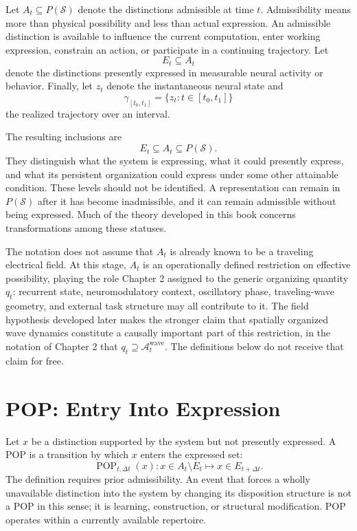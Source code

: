 \documentclass[11pt]{book}
\begin{document}
Let $A_t\subseteq P(\mathcal S)$ denote the distinctions admissible at time $t$. Admissibility means more than physical possibility and less than actual expression. An admissible distinction is available to influence the current computation, enter working expression, constrain an action, or participate in a continuing trajectory. Let
\[
E_t\subseteq A_t
\]
denote the distinctions presently expressed in measurable neural activity or behavior. Finally, let $z_t$ denote the instantaneous neural state and
\[
\gamma_{[t_0,t_1]}
=
\{z_t:t\in[t_0,t_1]\}
\]
the realized trajectory over an interval.

The resulting inclusions are
\[
E_t\subseteq A_t\subseteq P(\mathcal S).
\]
They distinguish what the system is expressing, what it could presently express, and what its persistent organization could express under some other attainable condition. These levels should not be identified. A representation can remain in $P(\mathcal S)$ after it has become inadmissible, and it can remain admissible without being expressed. Much of the theory developed in this book concerns transformations among these statuses.

The notation does not assume that $A_t$ is already known to be a traveling electrical field. At this stage, $A_t$ is an operationally defined restriction on effective possibility, playing the role Chapter 2 assigned to the generic organizing quantity $q_t$: recurrent state, neuromodulatory context, oscillatory phase, traveling-wave geometry, and external task structure may all contribute to it. The field hypothesis developed later makes the stronger claim that spatially organized wave dynamics constitute a causally important part of this restriction, in the notation of Chapter 2 that $q_t \supseteq \mathcal A_t^{\mathrm{wave}}$. The definitions below do not receive that claim for free.

\section*{POP: Entry Into Expression}

Let $x$ be a distinction supported by the system but not presently expressed. A POP is a transition by which $x$ enters the expressed set:
\[
\operatorname{POP}_{t,\Delta t}(x):
x\in A_t\setminus E_t
\longmapsto
x\in E_{t+\Delta t}.
\]
The definition requires prior admissibility. An event that forces a wholly unavailable distinction into the system by changing its disposition structure is not a POP in this sense; it is learning, construction, or structural modification. POP operates within a currently available repertoire.
\end{document}
